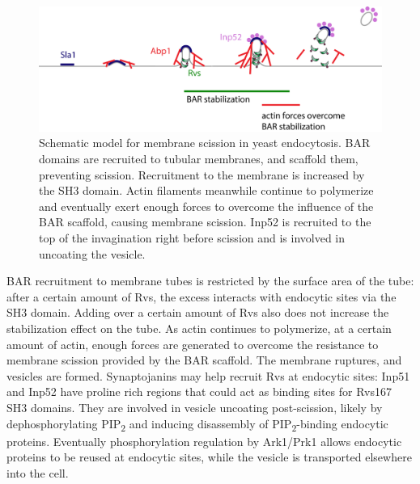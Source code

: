 \begin{figure}[H]
	\vspace*{1cm}
	\hspace*{-0.cm}
	\includegraphics[scale=0.65]{figures/discussion/yeast_schematic_concl2}
	\caption [Model for membrane scission in yeast]
	{ Schematic model for membrane scission in yeast endocytosis. BAR domains are recruited to tubular membranes, and scaffold them, preventing scission. Recruitment to the membrane is increased by the SH3 domain. Actin filaments meanwhile continue to polymerize and eventually exert enough forces to overcome the influence of the BAR scaffold, causing membrane scission. Inp52 is recruited to the top of the invagination right before scission and is involved in uncoating the vesicle. 
		\label{model}}
\end{figure}

BAR recruitment to membrane tubes is restricted by the surface area of the tube: after a certain amount of Rvs, the excess interacts with endocytic sites via the SH3 domain. Adding over a certain amount of Rvs also does not increase the stabilization effect on the tube. As actin continues to polymerize, at a certain amount of actin, enough forces are generated to overcome the resistance to membrane scission provided by the BAR scaffold. The membrane ruptures, and vesicles are formed. Synaptojanins may help recruit Rvs at endocytic sites: Inp51 and Inp52 have proline rich regions that could act as binding sites for Rvs167 SH3 domains. They are involved in vesicle uncoating post-scission, likely by dephosphorylating PIP\textsubscript{2} and inducing disassembly of 	PIP\textsubscript{2}-binding endocytic proteins. Eventually phosphorylation regulation by Ark1/Prk1 allows endocytic proteins to be reused at endocytic sites, while the vesicle is transported elsewhere into the cell. 






